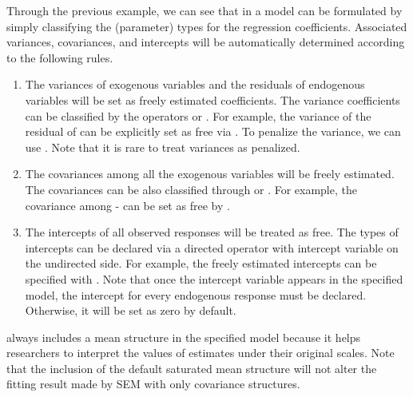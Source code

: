 \documentclass[nojss]{jss}
\begin{document}
Through the previous example, we can see that in  a model can be formulated by simply classifying the (parameter) types for the regression coefficients. Associated variances, covariances, and intercepts will be automatically determined according to the following rules.
\begin{enumerate}
\item The variances of exogenous variables and the residuals of endogenous variables will be set as freely estimated coefficients. The variance coefficients can be classified by the operators \code{<=>} or \code{<~>}. For example, the variance of the residual of  can be explicitly set as free via . To penalize the variance, we can use . Note that it is rare to treat variances as penalized.
\item The covariances among all the exogenous variables will be freely estimated. The covariances can be also classified through \code{<=>} or \code{<~>}. For example, the covariance among  -  can be set as free by .
\item The intercepts of all observed responses will be treated as free. The types of intercepts can be declared via a directed operator with intercept variable  on the undirected side. For example, the freely estimated intercepts can be specified with . Note that once the intercept variable  appears in the specified model, the intercept for every endogenous response must be declared. Otherwise, it will be set as zero by default.
\end{enumerate}
 always includes a mean structure in the specified model because it helps researchers to interpret the values of estimates under their original scales. Note that the inclusion of the default saturated mean structure will not alter the fitting result made by SEM with only covariance structures.
\end{document}

